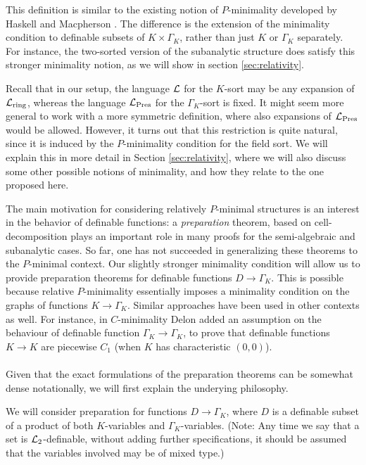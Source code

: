 This definition is similar to the existing notion of $P$-minimality developed by Haskell and Macpherson \cite{has-mac-97}. The difference is the extension of the minimality condition to definable subsets of $K\times \Gamma_K$, rather than just $K$ or $\Gamma_K$ separately. 
For instance, the two-sorted version of the subanalytic structure does satisfy this stronger minimality notion, as we will show in section \ref{sec:relativity}.

Recall that in our setup, the language $\mathcal{L}$ for the $K$-sort may be any expansion of $\mathcal{L}_{\text{ring}}$, whereas the language ${\mathcal L}_{\text{Pres}}$ for the $\Gamma_K$-sort is fixed. It might seem more general to work with a more symmetric definition, where also expansions of ${\mathcal L}_{\text{Pres}}$ would be allowed. However, it turns out that this restriction is quite natural, since it is induced by the $P$-minimality condition for the field sort.  We will explain this in more detail in Section \ref{sec:relativity}, where we will also discuss some other possible notions of minimality, and how they  relate to the one proposed here.

 
The main motivation for considering relatively $P$-minimal structures is an interest in the behavior of definable functions: 
  a \emph{preparation} theorem, based on cell-decomposition plays an important role in many proofs for the semi-algebraic and subanalytic cases. So far, one has not succeeded in generalizing these theorems to the $P$-minimal context.
Our slightly stronger minimality condition will allow us to provide preparation theorems for definable functions $D \to \Gamma_K$. This is possible because relative $P$-minimality  essentially imposes a minimality condition on the graphs of functions $K \to \Gamma_K$. Similar approaches have been used in other contexts as well.
For instance, in $C$-minimality Delon \cite{delon-12} added an assumption on the behaviour of definable function $\Gamma_K \to \Gamma_K$, to prove that definable functions $K \to K$ are piecewise $C_1$ (when $K$ has characteristic $(0,0)$). 
\\\\
Given that the exact formulations of the preparation theorems can be somewhat dense notationally, we will first explain the underying philosophy. 

We will consider preparation for functions $D \to \Gamma_K$, where $D$ is a definable subset of a product of both $K$-variables and $\Gamma_K$-variables. (Note: Any time we say that a set is $\mathcal{L}_2$-definable, without adding further specifications, it should be assumed that the variables involved may be of mixed type.)

